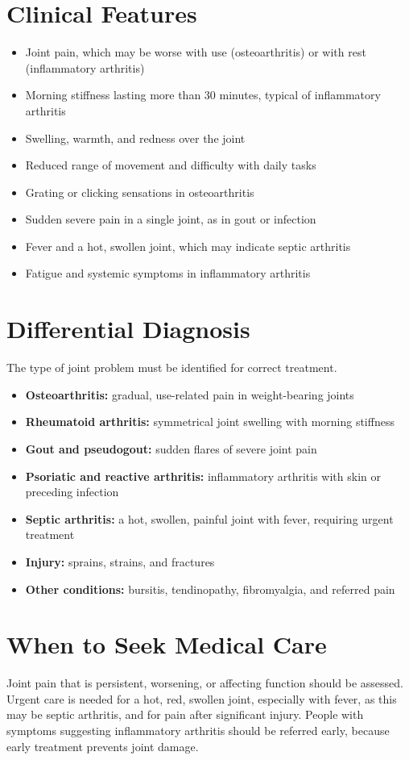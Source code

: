 \section*{Clinical Features}
\begin{itemize}
    \item Joint pain, which may be worse with use (osteoarthritis) or with rest (inflammatory arthritis)
    \item Morning stiffness lasting more than 30 minutes, typical of inflammatory arthritis
    \item Swelling, warmth, and redness over the joint
    \item Reduced range of movement and difficulty with daily tasks
    \item Grating or clicking sensations in osteoarthritis
    \item Sudden severe pain in a single joint, as in gout or infection
    \item Fever and a hot, swollen joint, which may indicate septic arthritis
    \item Fatigue and systemic symptoms in inflammatory arthritis
\end{itemize}

\section*{Differential Diagnosis}
The type of joint problem must be identified for correct treatment.
\begin{itemize}
    \item \textbf{Osteoarthritis:} gradual, use-related pain in weight-bearing joints
    \item \textbf{Rheumatoid arthritis:} symmetrical joint swelling with morning stiffness
    \item \textbf{Gout and pseudogout:} sudden flares of severe joint pain
    \item \textbf{Psoriatic and reactive arthritis:} inflammatory arthritis with skin or preceding infection
    \item \textbf{Septic arthritis:} a hot, swollen, painful joint with fever, requiring urgent treatment
    \item \textbf{Injury:} sprains, strains, and fractures
    \item \textbf{Other conditions:} bursitis, tendinopathy, fibromyalgia, and referred pain
\end{itemize}

\section*{When to Seek Medical Care}
Joint pain that is persistent, worsening, or affecting function should be assessed. Urgent care is needed for a hot, red, swollen joint, especially with fever, as this may be septic arthritis, and for pain after significant injury. People with symptoms suggesting inflammatory arthritis should be referred early, because early treatment prevents joint damage.

